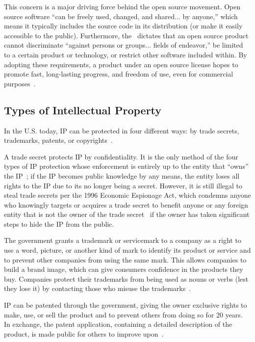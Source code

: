 \documentclass[12pt,letterpaper]{article}
\begin{document}
This concern is a major driving force behind the open source movement. Open
source software ``can be freely used, changed, and shared...  by anyone,''
which means it typically includes the source code in its distribution (or make
it easily accessible to the public). Furthermore, the~\citet{osi2015} dictates
that an open source product cannot discriminate ``against persons or groups...
fields of endeavor,'' be limited to a certain product or technology, or
restrict other software included within. By adopting these requirements,
a product under an open source license hopes to promote fast, long-lasting
progress, and freedom of use, even for commercial purposes~\citep{osi2015}.


\subsection*{Types of Intellectual Property}


In the U.S. today, IP can be protected in four different ways: by trade
secrets, trademarks, patents, or copyrights~\citep[p. 169]{quinn2015}.

A trade secret protects IP by confidentiality. It is the only method of the
four types of IP protection whose enforcement is entirely up to the entity that
``owns'' the IP~\citep[p. 169]{quinn2015}; if the IP becomes public knowledge
by any means, the entity loses all rights to the IP due to its no longer being
a secret. However, it is still illegal to steal trade secrets per the 1996
Economic Espionage Act, which condemns anyone who knowingly targets or acquires
a trade secret to benefit anyone or any foreign entity that is not the owner of
the trade secret~\citep{fbi2015} if the owner has taken significant steps to
hide the IP from the public.

The government grants a trademark or servicemark to a company as a right to use
a word, picture, or another kind of mark to identify its product or service and
to prevent other companies from using the same mark. This allows companies to
build a brand image, which can give consumers confidence in the products they
buy. Companies protect their trademarks from being used as nouns or verbs (lest
they lose it) by contacting those who misuse the trademarks~\citep[p.
170]{quinn2015}.

IP can be patented through the government, giving the owner exclusive rights to
make, use, or sell the product and to prevent others from doing so for 20
years. In exchange, the patent application, containing a detailed description
of the product, is made public for others to improve upon~\citep[p.
170]{quinn2015}.
\end{document}
